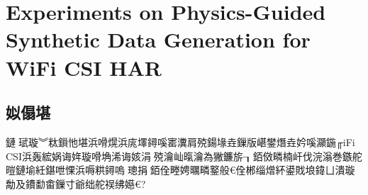 ﻿%

\chapter{Experiments on Physics-Guided Synthetic Data Generation for WiFi CSI HAR}
\label{chap:experiments}

\section{姒傝堪}
\label{sec:overview}

鏈珷璇︾粏鎻忚堪浜嗗熀浜庣墿鐞嗘寚瀵肩殑鍚堟垚鏁版嵁鐢熸垚妗嗘灦鍦╓iFi CSI浜轰綋娲诲姩璇嗗埆浠诲姟涓殑瀹屾暣瀹為獙鐮旂┒銆傚疄楠屽伐浣滃巻鏃舵暟鏈堬紝鍖呭惈浜嗕粠鐞嗚璁捐銆佺畻娉曞疄鐜般€佺郴缁熷紑鍙戝埌鍏ㄩ潰璇勪及鐨勫畬鏁寸爺绌舵祦绋嬨€?

